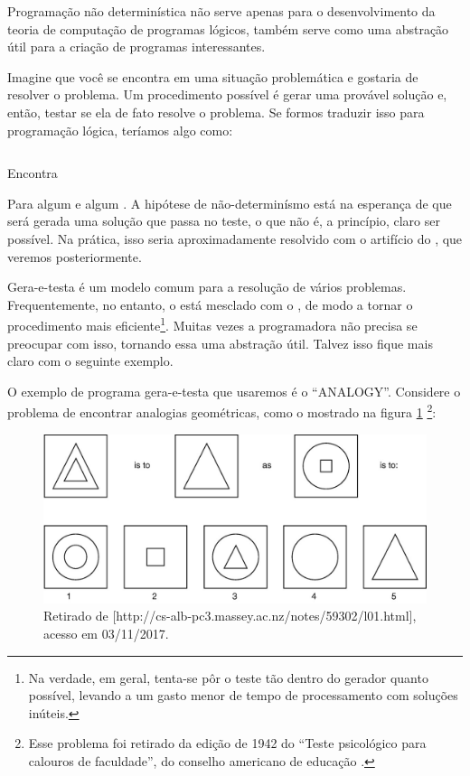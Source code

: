 \documentclass{article}
\begin{document}
  Programação não determinística não serve apenas para o
  desenvolvimento da teoria de computação de programas lógicos, também
  serve como uma abstração útil para a criação de programas
  interessantes. 

  Imagine que você se encontra em uma situação problemática e gostaria
  de resolver o problema. Um procedimento possível é gerar uma
  provável solução e, então, testar se ela de fato resolve o
  problema. Se formos traduzir isso para programação lógica, teríamos
  algo como: 

    \begin{listing}
\inputminted{prolog}{../Exemplos/Cap1/prog2_encontra.pl}
\caption{Encontra}
    \end{listing}

Para algum  e algum . A hipótese de
não-determinísmo está na esperança de que será gerada uma solução que
passa no teste, o que não é, a princípio, claro ser possível. Na
prática, isso seria aproximadamente resolvido com o artifício do
, que veremos posteriormente. 

Gera-e-testa é um modelo comum para a resolução de vários
problemas. Frequentemente, no entanto, o  está
mesclado com o , de modo a tornar o procedimento mais
eficiente\footnote{Na verdade, em geral, tenta-se pôr o teste tão
  dentro do gerador quanto possível, levando a um gasto menor de tempo
  de processamento com soluções inúteis.}. Muitas vezes a programadora
não precisa se preocupar com isso, tornando essa uma abstração
útil. Talvez isso fique mais claro com o seguinte exemplo. 

O exemplo de programa gera-e-testa que usaremos é o
``ANALOGY''. Considere o problema de encontrar analogias geométricas,
como o mostrado na figura \ref{fig:psi} \footnote{Esse problema foi
  retirado da edição de 1942 do ``Teste psicológico para calouros de
  faculdade'', do conselho americano de educação \cite{evans}.}: 

\begin{figure}[h]
  \caption{Retirado de [http://cs-alb-pc3.massey.ac.nz/notes/59302/l01.html], acesso em 03/11/2017.}\label{fig:psi}
  \centering
  \includegraphics[width=\linewidth]{analogy}
\end{figure}
\end{document}
